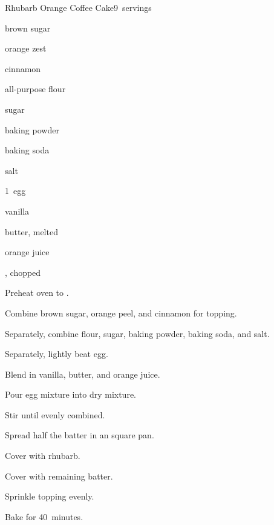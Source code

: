 \begin{recipe}{Rhubarb Orange Coffee Cake\UNTESTED}{}{9~servings}

\begin{ingredients}
\item \C{\quarter} brown sugar
\item {} orange zest
\item \tp{\half} cinnamon
\item {} all-purpose flour
\item \C{\threequarter} sugar
\item {} baking powder
\item \tp{\half} baking soda
\item \tp{\half} salt
\item 1~egg
\item {} vanilla
\item \C{\third} butter, melted
\item {} orange juice
\item \C{1\half} , chopped
\end{ingredients}

\begin{directions}
\item Preheat oven to .
\item Combine brown sugar, orange peel, and cinnamon for topping.
\item Separately, combine flour, sugar, baking powder, baking soda, and salt.
\item Separately, lightly beat egg.
\item Blend in vanilla, butter, and orange juice.
\item Pour egg mixture into dry mixture.
\item Stir until evenly combined.
\item Spread half the batter in an  square pan.
\item Cover with rhubarb.
\item Cover with remaining batter.
\item Sprinkle topping evenly.
\item Bake for 40~minutes.
\end{directions}

\end{recipe}
